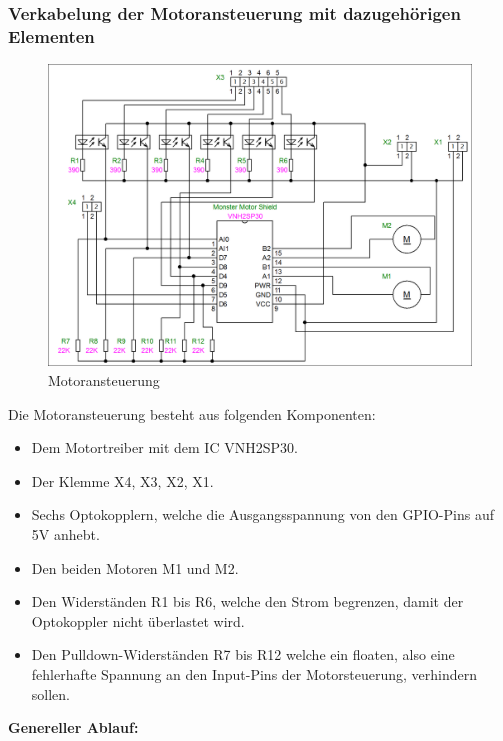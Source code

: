 \subsubsection{Verkabelung der Motoransteuerung mit dazugehörigen Elementen}
\begin{figure}[H] 

\begin{center}

\includegraphics[width=15cm]{Bilder/Schaltplan/Motoransteuerung}
\caption{Motoransteuerung}
\label{Motoransteuerung}
\end{center}
\end{figure}
Die Motoransteuerung besteht aus folgenden Komponenten:\\
\begin{itemize}
\item Dem Motortreiber mit dem IC VNH2SP30.
\item Der Klemme X4, X3, X2, X1.
\item Sechs Optokopplern, welche die Ausgangsspannung von den GPIO-Pins auf 5V anhebt.
\item Den beiden Motoren M1 und M2.
\item Den Widerständen R1 bis R6, welche den Strom begrenzen, damit der Optokoppler nicht überlastet wird.
\item Den Pulldown-Widerständen R7 bis R12 welche ein floaten, also eine fehlerhafte Spannung an den Input-Pins der Motorsteuerung, verhindern sollen. \\
\end{itemize}
\textbf{Genereller Ablauf:}
